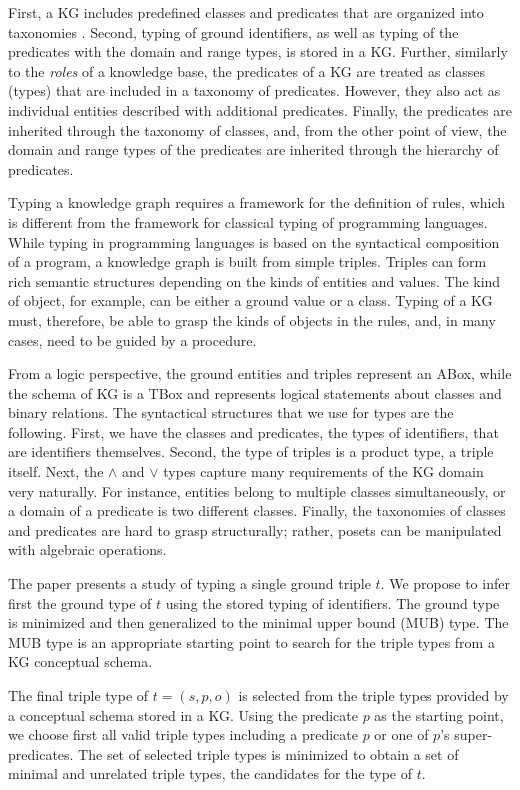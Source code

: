 \documentclass[runningheads]{llncs}
\begin{document}
First, a KG includes predefined classes and predicates that are
organized into taxonomies \cite{Baader2002}. Second, typing of ground
identifiers, as well as typing of the predicates with the domain and
range types, is stored in a KG. Further, similarly to the \emph{roles}
\cite{Brachman1985} of a knowledge base, the predicates of a KG are
treated as classes (types) that are included in a taxonomy of
predicates. However, they also act as individual entities described
with additional predicates. Finally, the predicates are inherited
through the taxonomy of classes, and, from the other point of view,
the domain and range types of the predicates are inherited through the
hierarchy of predicates.

Typing a knowledge graph requires a framework for the definition of
rules, which is different from the framework for classical typing of
programming languages. While typing in programming languages is based
on the syntactical composition of a program, a knowledge graph is
built from simple triples. Triples can form rich semantic structures
depending on the kinds of entities and values. The kind of object,
for example, can be either a ground value or a class. Typing of a KG
must, therefore, be able to grasp the kinds of objects in the rules,
and, in many cases, need to be guided by a procedure.

From a logic perspective, the ground entities and triples represent
an ABox, while the schema of KG is a TBox and represents logical
statements about classes and binary relations. The syntactical
structures that we use for types are the following. First, we have 
the classes and predicates, the types of identifiers, that are
identifiers themselves. Second, the type of triples is a product type,
a triple itself. Next, the $\land$ and $\lor$ types capture many
requirements of the KG domain very naturally. For instance, entities
belong to multiple classes simultaneously, or a domain of a predicate
is two different classes. Finally, the taxonomies of classes and
predicates are hard to grasp structurally; rather, posets can be
manipulated with algebraic operations.

The paper presents a study of typing a single ground triple $t$. We
propose to infer first the ground type of $t$ using the stored typing
of identifiers. The ground type is minimized and then generalized to
the minimal upper bound (MUB) type. The MUB type is an appropriate
starting point to search for the triple types from a KG conceptual
schema.

The final triple type of $t=(s,p,o)$ is selected from the triple types
provided by a conceptual schema stored in a KG. Using the predicate
$p$ as the starting point, we choose first all valid triple types
including a predicate $p$ or one of $p$'s super-predicates. The set of
selected triple types is minimized to obtain a set of minimal and
unrelated triple types, the candidates for the type of $t$.
\end{document}
